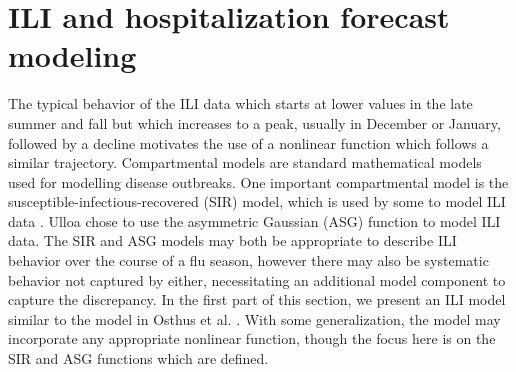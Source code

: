 




























\section{ILI and hospitalization forecast modeling} \label{sec:functions}


The typical behavior of the ILI data which starts at lower values in the late 
summer and fall but which increases to a peak, usually in December or January, 
followed by a decline motivates the use of a nonlinear function which follows 
a similar trajectory. Compartmental models are standard mathematical models 
used for modelling disease outbreaks. One important compartmental model is the 
susceptible-infectious-recovered (SIR) model, which is used by some to model 
ILI data \cite[]{osthus2019dynamic, allen2017primer}. Ulloa \cite[]{ulloa2019} 
chose to use the asymmetric Gaussian (ASG) function to model ILI data. The 
SIR and ASG models may both be appropriate to describe ILI behavior over the 
course of a flu season, however there may also be systematic behavior not 
captured by either, necessitating an additional model component to capture 
the discrepancy. In the first part of this section, we present an ILI model 
similar to the model in Osthus et al. \cite[]{osthus2019dynamic}. With some 
generalization, the model may incorporate any appropriate nonlinear function, 
though the focus here is on the SIR and ASG functions which are defined. 


